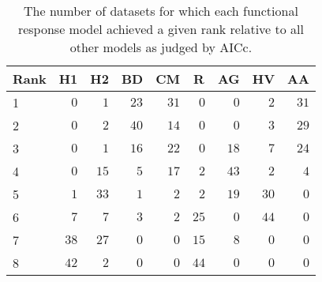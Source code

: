 \begin{table}[!tbp]
\caption{The number of datasets for which each functional response model achieved a given rank relative to all other models as judged by AICc.\label{table:AICc_rankings}} 
\begin{center}
\begin{tabular}{lrrrrrrrr}
\hline\hline
\multicolumn{1}{l}{Rank}&\multicolumn{1}{c}{H1}&\multicolumn{1}{c}{H2}&\multicolumn{1}{c}{BD}&\multicolumn{1}{c}{CM}&\multicolumn{1}{c}{R}&\multicolumn{1}{c}{AG}&\multicolumn{1}{c}{HV}&\multicolumn{1}{c}{AA}\tabularnewline
\hline
1&$ 0$&$ 1$&$23$&$31$&$ 0$&$ 0$&$ 2$&$31$\tabularnewline
2&$ 0$&$ 2$&$40$&$14$&$ 0$&$ 0$&$ 3$&$29$\tabularnewline
3&$ 0$&$ 1$&$16$&$22$&$ 0$&$18$&$ 7$&$24$\tabularnewline
4&$ 0$&$15$&$ 5$&$17$&$ 2$&$43$&$ 2$&$ 4$\tabularnewline
5&$ 1$&$33$&$ 1$&$ 2$&$ 2$&$19$&$30$&$ 0$\tabularnewline
6&$ 7$&$ 7$&$ 3$&$ 2$&$25$&$ 0$&$44$&$ 0$\tabularnewline
7&$38$&$27$&$ 0$&$ 0$&$15$&$ 8$&$ 0$&$ 0$\tabularnewline
8&$42$&$ 2$&$ 0$&$ 0$&$44$&$ 0$&$ 0$&$ 0$\tabularnewline
\hline
\end{tabular}\end{center}
\end{table}
